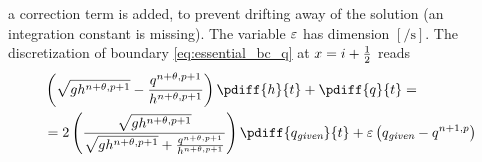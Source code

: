 a correction term is added, to prevent drifting away of the solution (an integration constant is missing).
The variable $\varepsilon$ has dimension $[\si{\per\second}]$.
The discretization of  boundary \autoref{eq:essential_bc_q} at $x=i+\frac{1}{2}$ reads
\begin{align}
    &\left(\sqrt{gh^{n+\theta,p+1}} - \frac{q^{n+\theta,p+1}}{h^{n+\theta,p+1}} \right) \pdiff{h}{t} + \pdiff{q}{t} =
    \nonumber \\*
    & = 2 \left(  \frac{\sqrt{gh^{n+\theta,p+1}}}{\sqrt{gh^{n+\theta,p+1}} + \frac{q^{n+\theta,p+1}}{h^{n+\theta,p+1}}} \right) \pdiff{q_{\textit{given}}}{t} + \eps \left( q_{\textit{given}} - q^{n+1,p}   \right)
\end{align}



